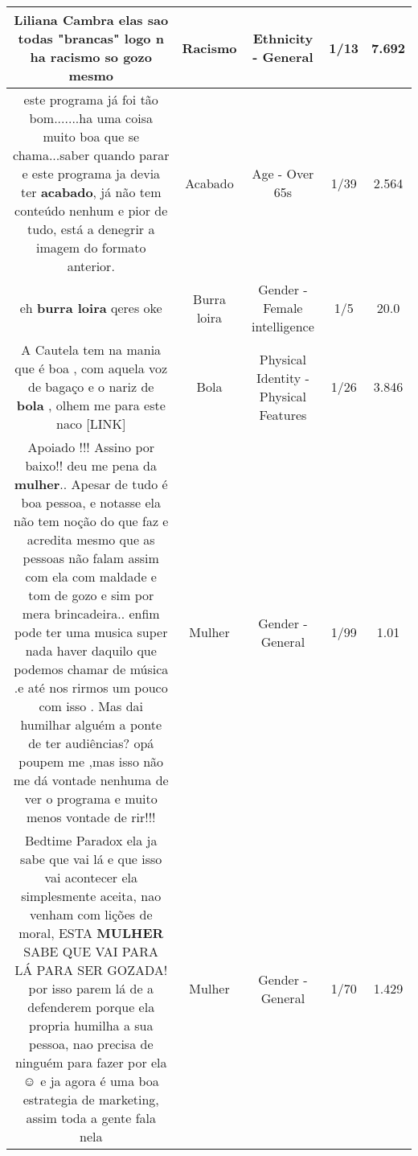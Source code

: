 \documentclass[11pt]{article}
\newlength\mylength
\begin{document}
\begin{center}
\begin{longtable}{|C{.65\mylength}|C{.30\mylength}|C{.12\mylength}|C{.12\mylength}|C{.12\mylength}|}
  \small Liliana Cambra elas sao todas "brancas" logo n ha \textbf{racismo} so gozo mesmo\normalsize   & Racismo & Ethnicity - General & 1/13 & 7.692 \\  \hline
  \small este programa já foi tão bom.......ha uma coisa muito boa que se chama...saber quando parar e este programa ja devia ter \textbf{acabado}, já não tem conteúdo nenhum e pior de tudo, está a denegrir a imagem do formato anterior.\normalsize   & Acabado & Age - Over 65s & 1/39 & 2.564 \\  \hline
  \small eh \textbf{burra loira} qeres oke\normalsize   & Burra loira & Gender - Female intelligence & 1/5 & 20.0 \\  \hline
  \small A Cautela tem na mania que é boa , com aquela voz de bagaço e o nariz de \textbf{bola} , olhem me para este naco  [LINK] \normalsize   & Bola & Physical Identity - Physical Features & 1/26 & 3.846 \\  \hline
  \small Apoiado !!! Assino por baixo!! deu me pena da \textbf{mulher}.. Apesar de tudo é boa pessoa, e notasse ela não tem noção do que faz e acredita mesmo que as pessoas não falam assim com ela com maldade e tom de gozo e sim por mera brincadeira.. enfim pode ter uma musica super nada haver daquilo que podemos chamar de música .e até nos rirmos um pouco com isso . Mas dai humilhar alguém a ponte de ter audiências? opá poupem me ,mas isso não me dá vontade nenhuma de ver o programa e muito menos vontade de rir!!!\normalsize   & Mulher & Gender - General & 1/99 & 1.01 \\  \hline
  \small Bedtime Paradox ela ja sabe que vai lá  e que isso vai acontecer ela simplesmente aceita, nao venham com lições  de moral, ESTA \textbf{MULHER} SABE QUE VAI PARA LÁ  PARA SER GOZADA! por isso parem lá  de a defenderem porque ela propria humilha a sua pessoa, nao precisa de ninguém  para fazer por ela ☺ e ja agora é uma boa estrategia de marketing, assim toda a gente fala nela\normalsize   & Mulher & Gender - General & 1/70 & 1.429 \\  \hline

\end{longtable}
\end{center}
\end{document}
